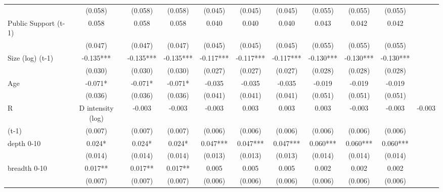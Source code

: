 \begin{table}[htbp]
\begin{tabular}{l*{9}{c}}
                    &     (0.058)   &     (0.058)   &     (0.058)   &     (0.045)   &     (0.045)   &     (0.045)   &     (0.055)   &     (0.055)   &     (0.055)   \\
Public Support (t-1)&       0.058   &       0.058   &       0.058   &       0.040   &       0.040   &       0.040   &       0.043   &       0.042   &       0.042   \\
                    &     (0.047)   &     (0.047)   &     (0.047)   &     (0.045)   &     (0.045)   &     (0.045)   &     (0.055)   &     (0.055)   &     (0.055)   \\
Size (log) (t-1)    &      -0.135***&      -0.135***&      -0.135***&      -0.117***&      -0.117***&      -0.117***&      -0.130***&      -0.130***&      -0.130***\\
                    &     (0.030)   &     (0.030)   &     (0.030)   &     (0.027)   &     (0.027)   &     (0.027)   &     (0.028)   &     (0.028)   &     (0.028)   \\
Age                 &      -0.071*  &      -0.071*  &      -0.071*  &      -0.035   &      -0.035   &      -0.035   &      -0.019   &      -0.019   &      -0.019   \\
                    &     (0.036)   &     (0.036)   &     (0.036)   &     (0.041)   &     (0.041)   &     (0.041)   &     (0.051)   &     (0.051)   &     (0.051)   \\
R&D intensity (log) &      -0.003   &      -0.003   &      -0.003   &       0.003   &       0.003   &       0.003   &      -0.003   &      -0.003   &      -0.003   \\
(t-1)               &     (0.007)   &     (0.007)   &     (0.007)   &     (0.006)   &     (0.006)   &     (0.006)   &     (0.006)   &     (0.006)   &     (0.006)   \\
depth 0-10          &       0.024*  &       0.024*  &       0.024*  &       0.047***&       0.047***&       0.047***&       0.060***&       0.060***&       0.060***\\
                    &     (0.014)   &     (0.014)   &     (0.014)   &     (0.013)   &     (0.013)   &     (0.013)   &     (0.014)   &     (0.014)   &     (0.014)   \\
breadth 0-10        &       0.017** &       0.017** &       0.017** &       0.005   &       0.005   &       0.005   &       0.002   &       0.002   &       0.002   \\
                    &     (0.007)   &     (0.007)   &     (0.007)   &     (0.006)   &     (0.006)   &     (0.006)   &     (0.006)   &     (0.006)   &     (0.006)   \\

\end{tabular}
\end{table}

